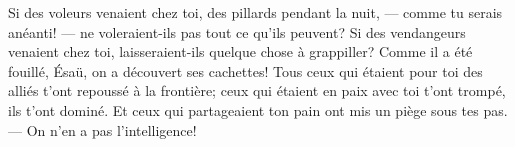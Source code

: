 Si des voleurs venaient chez toi, des pillards pendant la nuit,
	--- comme tu serais anéanti! --- 
	ne voleraient-ils pas tout ce qu’ils peuvent?
Si des vendangeurs venaient chez toi,
	laisseraient-ils quelque chose à grappiller?
Comme il a été fouillé, Ésaü, on a découvert ses cachettes!
Tous ceux qui étaient pour toi des alliés t’ont repoussé à la frontière;
	ceux qui étaient en paix avec toi t’ont trompé, ils t’ont dominé.
Et ceux qui partageaient ton pain ont mis un piège sous tes pas.
	--- On n’en a pas l’intelligence!
